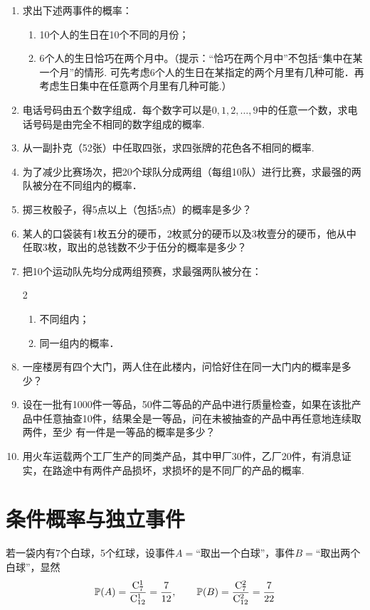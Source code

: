 \begin{enumerate}
\item 求出下述两事件的概率：
\begin{enumerate}[(1)]
    \item 10个人的生日在10个不同的月份；
\item 6个人的生日恰巧在两个月中。（提示：“恰巧在两个月中”不包括“集中在某一个月”的情形. 可先考虑6个人的生日在某指定的两个月里有几种可能．再考虑生日集中在任意两个月里有几种可能.）
\end{enumerate}

\item 电话号码由五个数字组成．每个数字可以是$0,1,2,\ldots,9$中的任意一个数，求电话号码是由完全不相同的数字组成的概率.
\item 从一副扑克（52张）中任取四张，求四张牌的花色各不相同的概率.
\item 为了减少比赛场次，把20个球队分成两组（每组10队）进行比赛，求最强的两队被分在不同组内的概率．
\item 掷三枚骰子，得5点以上（包括5点）的概率是多少？
\item 某人的口袋装有1枚五分的硬币，2枚贰分的硬币以及3枚壹分的硬币，他从中任取3枚，取出的总钱数不少于伍分的概率是多少？
\item 把10个运动队先均分成两组预赛，求最强两队被分在：
\begin{multicols}{2}
\begin{enumerate}[(1)]
\item 不同组内；    \item 同一组内的概率．
\end{enumerate}
\end{multicols}

\item 一座楼房有四个大门，两人住在此楼内，问恰好住在同一大门内的概率是多少？
\item 设在一批有1000件一等品，50件二等品的产品中进行质量检查，如果在该批产品中任意抽查10件，结果全是一等品，问在未被抽查的产品中再任意地连续取两件，至少
有一件是一等品的概率是多少？
\item 用火车运载两个工厂生产的同类产品，其中甲厂30件，乙厂20件，有消息证实，在路途中有两件产品损坏，求损坏的是不同厂的产品的概率.
\end{enumerate}

\section{条件概率与独立事件}
若一袋内有7个白球，5个红球，设事件$A=$“取出一个白球”，事件$B=$“取出两个白球”，显然
\[\mathbb{P}(A)=\dfrac{{\rm C}^{1}_{7}}{{\rm C}^{1}_{12}}=\dfrac{7}{12},\qquad \mathbb{P}(B)=\dfrac{{\rm C}^{2}_{7}}{{\rm C}^{2}_{12}}=\dfrac{7}{22}\]

